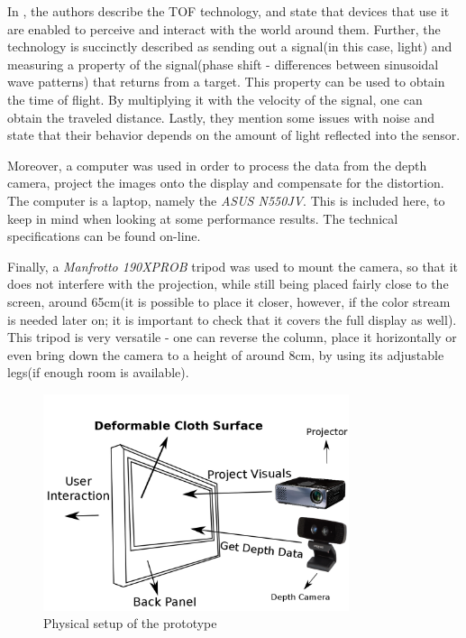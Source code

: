 \documentclass[]{article}
\begin{document}
\begin{itemize}
In \cite{gokturk}, the authors describe the TOF technology, and state that devices that use it are enabled to perceive and interact with the world around them. Further, the technology is succinctly described as sending out a signal(in this case, light) and measuring a property of the signal(phase shift - differences between sinusoidal wave patterns) that returns from a target. This property can be used to obtain the time of flight. By multiplying it with the velocity of the signal, one can obtain the traveled distance. Lastly, they mention some issues with noise and state that their behavior depends on the amount of light reflected into the sensor.
\end{itemize}


Moreover, a computer was used in order to process the data from the depth camera, project the images onto the display and compensate for the distortion. The computer is a laptop, namely the \textit{ASUS N550JV}. This is included here, to keep in mind when looking at some performance results. The technical specifications can be found on-line.

Finally, a \textit{Manfrotto 190XPROB} tripod was used to mount the camera, so that it does not interfere with the projection, while still being placed fairly close to the screen, around 65cm(it is possible to place it closer, however, if the color stream is needed later on; it is important to check that it covers the full display as well). This tripod is very versatile - one can reverse the column, place it horizontally or even bring down the camera to a height of around 8cm, by using its adjustable legs(if enough room is available).

\begin{figure}[hbtp]
    \centering
    \includegraphics[width=0.8\textwidth]{figures/thesis_setup_illustration_ui.png}
    \caption{Physical setup of the prototype}
    \label{fig:hardware_setup}
\end{figure}
\end{document}
